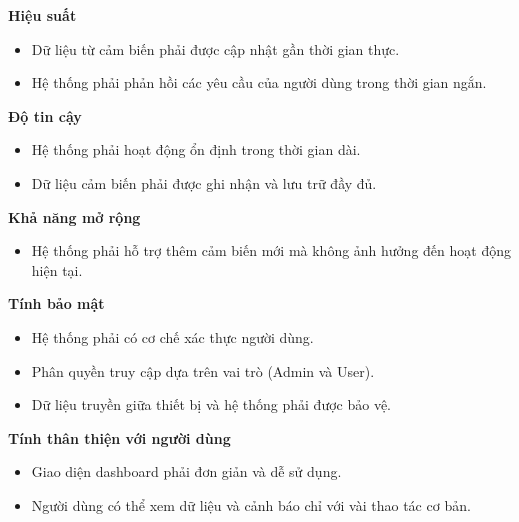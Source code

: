 \documentclass[a4paper,twoside]{article}
\begin{document}
\textbf{Hiệu suất}

\begin{itemize}

\item Dữ liệu từ cảm biến phải được cập nhật gần thời gian thực.

\item Hệ thống phải phản hồi các yêu cầu của người dùng
trong thời gian ngắn.

\end{itemize}

\textbf{Độ tin cậy}

\begin{itemize}

\item Hệ thống phải hoạt động ổn định trong thời gian dài.

\item Dữ liệu cảm biến phải được ghi nhận và lưu trữ đầy đủ.

\end{itemize}

\textbf{Khả năng mở rộng}

\begin{itemize}

\item Hệ thống phải hỗ trợ thêm cảm biến mới
mà không ảnh hưởng đến hoạt động hiện tại.

\end{itemize}

\textbf{Tính bảo mật}

\begin{itemize}

\item Hệ thống phải có cơ chế xác thực người dùng.

\item Phân quyền truy cập dựa trên vai trò (Admin và User).

\item Dữ liệu truyền giữa thiết bị và hệ thống
phải được bảo vệ.

\end{itemize}

\textbf{Tính thân thiện với người dùng}

\begin{itemize}

\item Giao diện dashboard phải đơn giản và dễ sử dụng.

\item Người dùng có thể xem dữ liệu và cảnh báo
chỉ với vài thao tác cơ bản.

\end{itemize}
\end{document}
